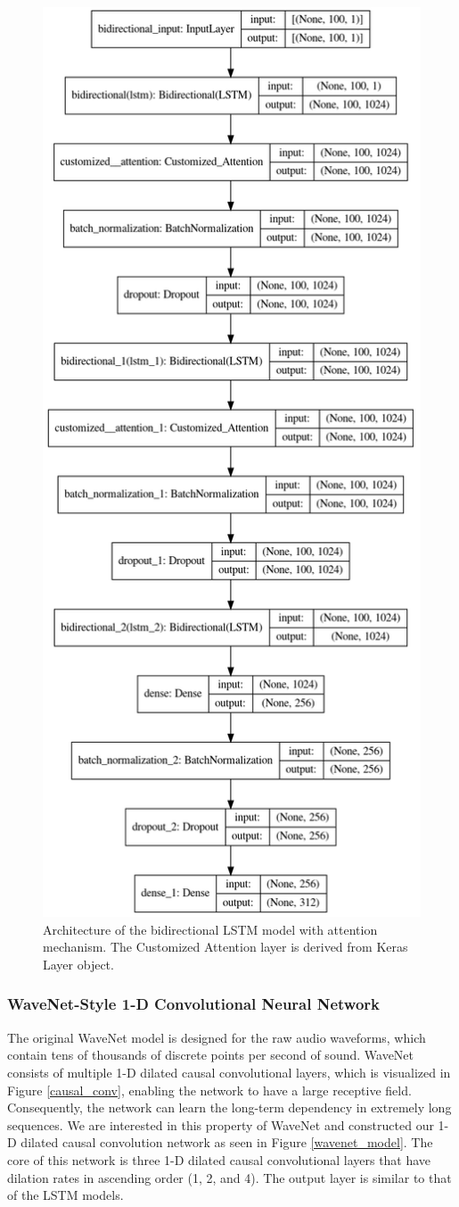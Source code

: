 \documentclass[sigconf,authorversion]{acmart}
\begin{document}
\begin{figure}[h]
  \centering
  \includegraphics[width=0.5\linewidth]{attention_model.png}
  \caption{Architecture of the bidirectional LSTM model with attention mechanism.
  The Customized Attention layer is derived from Keras Layer object.}
  \label{att_lstm_model}
\end{figure}

\subsubsection{WaveNet-Style 1-D Convolutional Neural Network}

The original WaveNet model is designed for the raw audio waveforms, which contain
tens of thousands of discrete points per second of sound. WaveNet consists of 
 multiple 1-D dilated causal convolutional layers, which is visualized in Figure 
 \ref{causal_conv}, enabling the network to have a large receptive field. Consequently,
 the network can learn the long-term dependency in extremely long sequences. We are
 interested in this property of WaveNet and constructed our 1-D dilated causal 
 convolution network as seen in Figure \ref{wavenet_model}. The core of this network
 is three 1-D dilated causal convolutional layers that have dilation rates in ascending order 
 (1, 2, and 4). The output layer is similar to that of the LSTM models.
\end{document}
